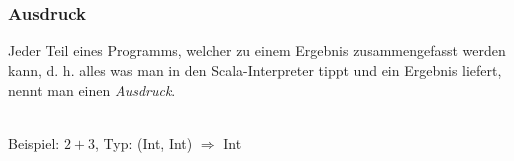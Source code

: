	\section*{}
		\begin{frame}
			\frametitle{Ausdruck}
			\begin{definition}
				Jeder Teil eines Programms, welcher zu einem Ergebnis 								zusammengefasst werden kann, d. h. alles was man in den 
				Scala-Interpreter tippt und ein Ergebnis liefert,
				nennt man einen \emph{Ausdruck}.
		\end{definition} 
		\leavevmode \\
		Beispiel:  $2+3$, Typ: (Int, Int) $\Rightarrow$ Int 	
		\end{frame}